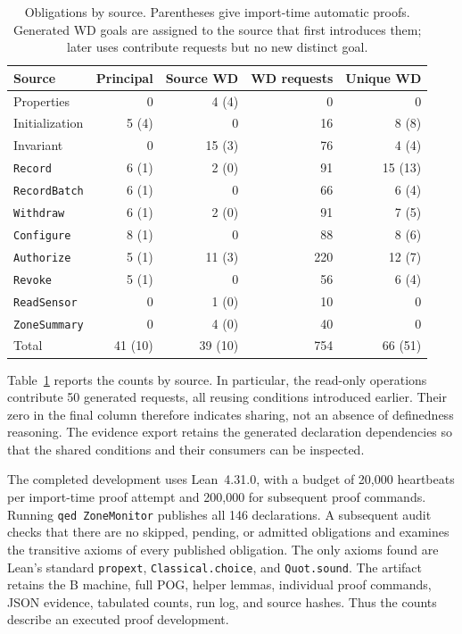 \begin{table}[tb]
\caption{Obligations by source. Parentheses give import-time automatic
proofs. Generated WD goals are assigned to the source that first introduces
them; later uses contribute requests but no new distinct goal.}
\label{tab:zone-evidence}
\small
\begin{tabular}{@{}lrrrr@{}}
\toprule
Source & Principal & Source WD & WD requests & Unique WD \\
\midrule
Properties & 0 & 4 (4) & 0 & 0 \\
Initialization & 5 (4) & 0 & 16 & 8 (8) \\
Invariant & 0 & 15 (3) & 76 & 4 (4) \\
\texttt{Record} & 6 (1) & 2 (0) & 91 & 15 (13) \\
\texttt{RecordBatch} & 6 (1) & 0 & 66 & 6 (4) \\
\texttt{Withdraw} & 6 (1) & 2 (0) & 91 & 7 (5) \\
\texttt{Configure} & 8 (1) & 0 & 88 & 8 (6) \\
\texttt{Authorize} & 5 (1) & 11 (3) & 220 & 12 (7) \\
\texttt{Revoke} & 5 (1) & 0 & 56 & 6 (4) \\
\texttt{ReadSensor} & 0 & 1 (0) & 10 & 0 \\
\texttt{ZoneSummary} & 0 & 4 (0) & 40 & 0 \\
\midrule
Total & 41 (10) & 39 (10) & 754 & 66 (51) \\
\bottomrule
\end{tabular}
\end{table}

Table~\ref{tab:zone-evidence} reports the counts by source. In particular,
the read-only operations contribute 50 generated requests, all reusing
conditions introduced earlier. Their zero in the final column therefore
indicates sharing, not an absence of definedness reasoning. The evidence
export retains the generated declaration dependencies so that the shared
conditions and their consumers can be inspected.

The completed development uses Lean~4.31.0, with a budget of 20,000
heartbeats per import-time proof attempt and 200,000 for subsequent
proof commands. Running \texttt{qed ZoneMonitor} publishes all 146
declarations. A subsequent audit checks that there are no skipped,
pending, or admitted obligations and examines the transitive axioms of
every published obligation. The only axioms found are Lean's standard
\texttt{propext}, \texttt{Classical.choice}, and \texttt{Quot.sound}.
The artifact retains the B machine, full POG, helper lemmas, individual
proof commands, JSON evidence, tabulated counts, run log, and source
hashes. Thus the counts describe an executed proof development.

